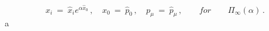 \begin{equation} x_i \ = \ \hat{x}_i e^{\alpha \hat{x}_0}\,
,\quad x_0 \ = \ \hat{p}_0\, ,\quad p_\mu \ = \ \hat{p}_\mu\,
,\qquad for \qquad \Pi_\infty(\alpha)\, .
\label{3r25}\end{equation}a

